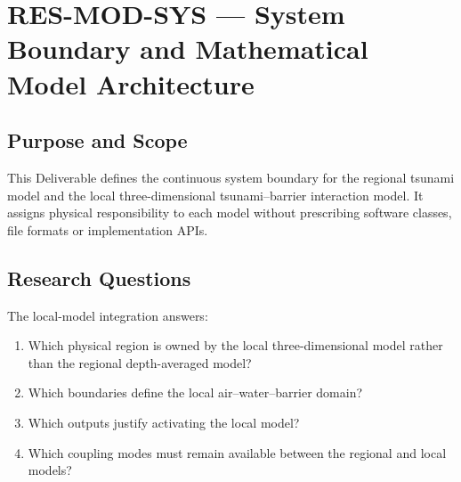 
\section{RES-MOD-SYS --- System Boundary and Mathematical Model Architecture}
\label{sec:res-mod-sys}

\subsection{Purpose and Scope}
\label{sec:res-mod-sys-purpose}


This Deliverable defines the continuous system boundary for the
regional tsunami model and the local three-dimensional
tsunami--barrier interaction model. It assigns physical responsibility
to each model without prescribing software classes, file formats or
implementation APIs.

\subsection{Research Questions}
\label{sec:res-mod-sys-research-questions}


The local-model integration answers:

\begin{enumerate}
  \item Which physical region is owned by the local three-dimensional
    model rather than the regional depth-averaged model?
  \item Which boundaries define the local air--water--barrier domain?
  \item Which outputs justify activating the local model?
  \item Which coupling modes must remain available between the
    regional and local models?
\end{enumerate}

